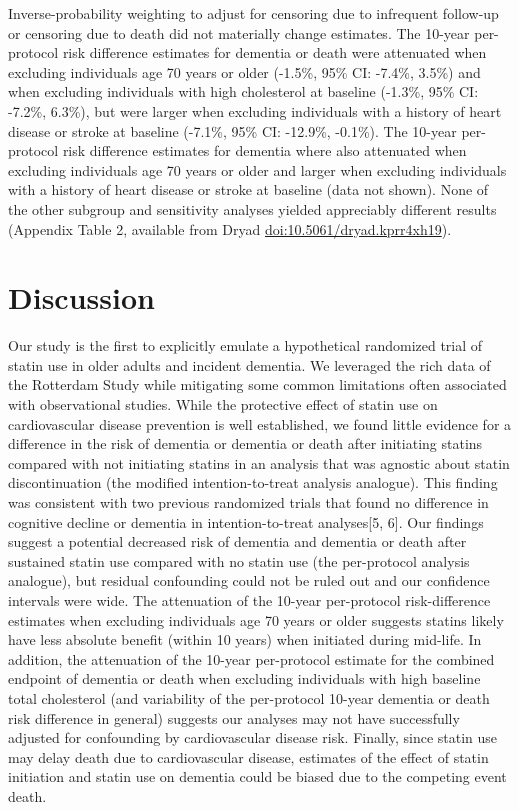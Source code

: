 \documentclass[
]{book}
\begin{document}
Inverse-probability weighting to adjust for censoring due to infrequent follow-up or censoring due to death did not materially change estimates. The 10-year per-protocol risk difference estimates for dementia or death were attenuated when excluding individuals age 70 years or older (-1.5\%, 95\% CI: -7.4\%, 3.5\%) and when excluding individuals with high cholesterol at baseline (-1.3\%, 95\% CI: -7.2\%, 6.3\%), but were larger when excluding individuals with a history of heart disease or stroke at baseline (-7.1\%, 95\% CI: -12.9\%, -0.1\%). The 10-year per-protocol risk difference estimates for dementia where also attenuated when excluding individuals age 70 years or older and larger when excluding individuals with a history of heart disease or stroke at baseline (data not shown). None of the other subgroup and sensitivity analyses yielded appreciably different results (Appendix Table 2, available from Dryad \url{doi:10.5061/dryad.kprr4xh19}).

\hypertarget{discussion}{%
\section{Discussion}\label{discussion}}

Our study is the first to explicitly emulate a hypothetical randomized trial of statin use in older adults and incident dementia. We leveraged the rich data of the Rotterdam Study while mitigating some common limitations often associated with observational studies. While the protective effect of statin use on cardiovascular disease prevention is well established, we found little evidence for a difference in the risk of dementia or dementia or death after initiating statins compared with not initiating statins in an analysis that was agnostic about statin discontinuation (the modified intention-to-treat analysis analogue). This finding was consistent with two previous randomized trials that found no difference in cognitive decline or dementia in intention-to-treat analyses{[}5, 6{]}. Our findings suggest a potential decreased risk of dementia and dementia or death after sustained statin use compared with no statin use (the per-protocol analysis analogue), but residual confounding could not be ruled out and our confidence intervals were wide. The attenuation of the 10-year per-protocol risk-difference estimates when excluding individuals age 70 years or older suggests statins likely have less absolute benefit (within 10 years) when initiated during mid-life. In addition, the attenuation of the 10-year per-protocol estimate for the combined endpoint of dementia or death when excluding individuals with high baseline total cholesterol (and variability of the per-protocol 10-year dementia or death risk difference in general) suggests our analyses may not have successfully adjusted for confounding by cardiovascular disease risk. Finally, since statin use may delay death due to cardiovascular disease, estimates of the effect of statin initiation and statin use on dementia could be biased due to the competing event death.
\end{document}
